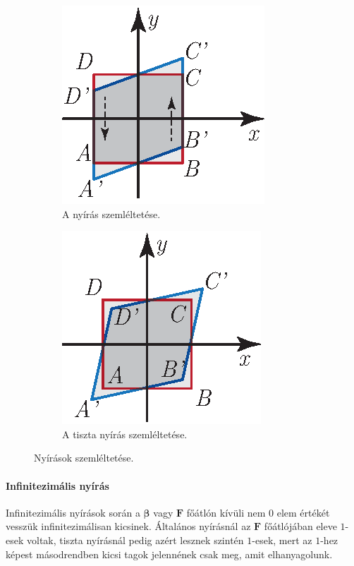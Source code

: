 \documentclass[12pt,a4paper]{scrartcl}
\let\mathbf\bm
\begin{document}
\begin{figure}[htb] 
\begin{subfigure}[b]{0.45\textwidth}
\centering
\includegraphics[scale=1]{figs/nyiras.eps}
\caption{A nyírás szemléltetése.}
\label{fig:nyiras}
\end{subfigure} \hfill
\begin{subfigure}[b]{0.45\textwidth}
\centering
\includegraphics[scale=1]{figs/tiszta_nyiras.eps}
\caption{A tiszta nyírás szemléltetése.}
\label{fig:tiszta_nyiras}
\end{subfigure}
\label{fig_nyujtasok}
\caption{Nyírások szemléltetése.}
\end{figure}


\paragraph{Infinitezimális nyírás}
Infinitezimális nyírások során a ${\mathbf{\beta }}$ vagy ${\mathbf{F}}$ főátlón kívüli nem $0$ elem értékét vesszük infinitezimálisan kicsinek. Általános nyírásnál az ${\mathbf{F}}$ főátlójában eleve $1$-esek voltak, tiszta nyírásnál pedig azért lesznek szintén $1$-esek, mert az $1$-hez képest másodrendben kicsi tagok jelennének csak meg, amit elhanyagolunk. 
\end{document}
